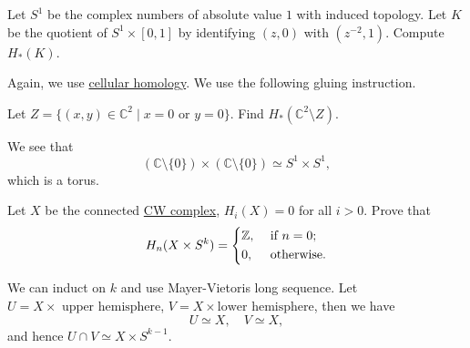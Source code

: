 \begin{exercise}[QR May 2017]
	Let \(S^1\) be the complex numbers of absolute value \(1\) with induced topology. Let \(K\) be the quotient of \(S^1 \times [0, 1]\) by identifying
	\((z, 0)\) with \((z^{-2}, 1 )\). Compute \(H_\ast (K)\).
\end{exercise}
\begin{answer}
	Again, we use \hyperref[def:cellular-homology-group]{cellular homology}. We use the following gluing instruction.
	\begin{figure}[H]
		\centering
		\label{fig:ans:ex-3:lec-40}
	\end{figure}
\end{answer}

\begin{exercise}[QR Sep. 2016]
	Let \(Z= \{(x, y)\in \mathbb{C} ^{2} \mid x = 0 \text{ or } y = 0\}\). Find \(H_\ast (\mathbb{C} ^{2} \setminus Z)\).
\end{exercise}
\begin{answer}
	We see that
	\[
		(\mathbb{C} \setminus \{0\})\times (\mathbb{C} \setminus \{0\}) \simeq S^1 \times S^1,
	\]
	which is a torus.
\end{answer}

\begin{exercise}[QR May 2017]
	Let \(X\) be the connected \hyperref[def:CW-Complex]{CW complex}, \(H_i(X) = 0\) for all \(i > 0\). Prove that
	\[
		H_n(X \times S^k) = \begin{dcases}
			\mathbb{Z}, & \text{ if } n = 0; \\
			0,          & \text{ otherwise}.
		\end{dcases}
	\]
\end{exercise}
\begin{answer}
	We can induct on \(k\) and use Mayer-Vietoris long sequence. Let \(U = X \times \text{ upper hemisphere}\), \(V = X \times \text{lower hemisphere}\), then we have
	\[
		U\simeq X,\quad V\simeq X,
	\]
	and hence \(U \cap V \simeq X \times S^{k-1}\).
\end{answer}